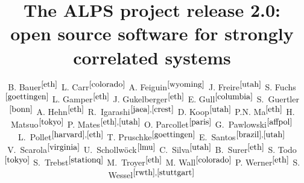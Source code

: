 \documentclass[12pt]{iopart}
\begin{document}
\title{The ALPS project release 2.0: \\ open source software for strongly correlated systems}


\newcommand{\myauthor}[3]{#2$^{#1}$}
\newcommand{\myaddress}[2]{\address{\refstepcounter{affiliation} $^{\arabic{affiliation}}$#2 \label{#1}}}

\author{
	\myauthor{\ref{eth}}{B. Bauer}{bauerb@phys.ethz.ch}
	\myauthor{\ref{colorado}}{L. Carr}{lcarr@mines.edu}
	\myauthor{\ref{wyoming}}{A. Feiguin}{afeiguin@uwyo.edu}
	\myauthor{\ref{utah}}{J. Freire}{juliana@cs.utah.edu}
	\myauthor{\ref{goettingen}}{S. Fuchs}{fuchs@theorie.physik.uni-goettingen.de}
	\myauthor{\ref{eth}}{L. Gamper}{gamperl@gmail.com}
	\myauthor{\ref{eth}}{J. Gukelberger}{gukelberger@phys.ethz.ch}
	\myauthor{\ref{columbia}}{E. Gull}{gull@phys.columbia.edu}
	\myauthor{\ref{bonn}}{S.~Guertler}{guertler@th.physik.uni-bonn.de}
	\myauthor{\ref{eth}}{A. Hehn}{hehn@phys.ethz.ch}
	\myauthor{\ref{jaea},\ref{crest}}{R.~Igarashi}{rigarash@hosi.phys.s.u-tokyo.ac.jp}
	\myauthor{\ref{utah}}{D. Koop}{dakoop@cs.utah.edu}
	\myauthor{\ref{eth}}{P.N. Ma}{pingnang@phys.ethz.ch}
	\myauthor{\ref{tokyo}}{H. Matsuo}{halm@looper.t.u-tokyo.ac.jp}
	\myauthor{\ref{eth},\ref{utah}}{P. Mates}{phillipmates@gmail.com}
	\myauthor{\ref{paris}}{O. Parcollet}{}
	\myauthor{\ref{affpol}}{G.~Pawlowski}{}
	\myauthor{\ref{harvard},\ref{eth}}{L.~Pollet}{pollet@phys.ethz.ch}
	\myauthor{\ref{goettingen}}{T. Pruschke}{pruschke@theorie.physik.uni-goettingen.de}
	\myauthor{\ref{brazil},\ref{utah}}{E.~Santos}{emanuele@sci.utah.edu}
	\myauthor{\ref{virginia}}{V.~Scarola}{scarola@vt.edu}
	\myauthor{\ref{lmu}}{U.~Schollw\"ock}{schollwoeck@lmu.de}
	\myauthor{\ref{utah}}{C.~Silva}{csilva@sci.utah.edu}
	\myauthor{\ref{eth}}{B.~Surer}{surerb@phys.ethz.ch}
	\myauthor{\ref{tokyo}}{S. Todo}{wistaria@ap.t.u-tokyo.ac.jp}
	\myauthor{\ref{stationq}}{S.~Trebst}{trebst@kitp.ucsb.edu}
	\myauthor{\ref{eth}}{M.~Troyer}{troyer@ethz.ch}
	\myauthor{\ref{colorado}}{M. Wall}{mwall@mymail.mines.edu}
	\myauthor{\ref{eth}}{P. Werner}{werner@phys.ethz.ch}
	\myauthor{\ref{rwth},\ref{stuttgart}}{S. Wessel}{wessel@phys.ethz.ch}
}
\end{document}
